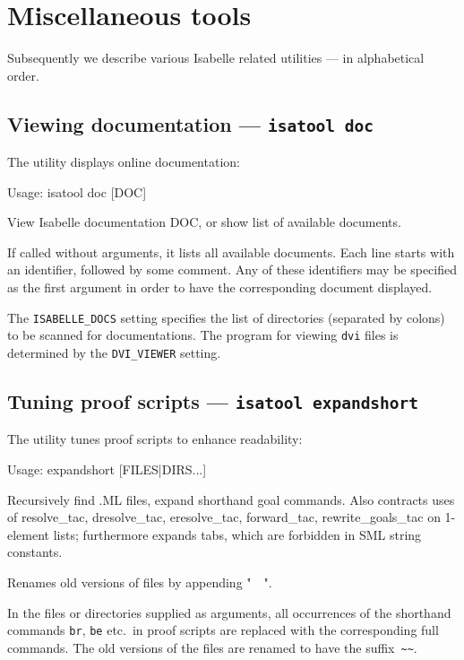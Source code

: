 

\chapter{Miscellaneous tools} \label{ch:tools}

Subsequently we describe various Isabelle related utilities --- in
alphabetical order.


\section{Viewing documentation --- \texttt{isatool doc}} \label{sec:tool-doc}

The  utility displays online documentation:
\begin{ttbox}
Usage: isatool doc [DOC]

  View Isabelle documentation DOC, or show list of available documents.
\end{ttbox}
If called without arguments, it lists all available documents. Each
line starts with an identifier, followed by some comment. Any of these
identifiers may be specified as the first argument in order to have
the corresponding document displayed.

\medskip The \texttt{ISABELLE_DOCS} setting specifies the list of
directories (separated by colons) to be scanned for documentations.
The program for viewing \texttt{dvi} files is determined by the
\texttt{DVI_VIEWER} setting.


\section{Tuning proof scripts --- \texttt{isatool expandshort}}

The  utility tunes {\ML} proof scripts to enhance
readability:
\begin{ttbox}
Usage: expandshort [FILES|DIRS...]

  Recursively find .ML files, expand shorthand goal commands.  Also
  contracts uses of resolve_tac, dresolve_tac, eresolve_tac,
  forward_tac, rewrite_goals_tac on 1-element lists; furthermore expands
  tabs, which are forbidden in SML string constants.

  Renames old versions of files by appending "~~".
\end{ttbox}
In the files or directories supplied as arguments, all occurrences of
the shorthand commands \texttt{br}, \texttt{be} etc.\ in proof scripts
are replaced with the corresponding full commands.  The old versions
of the files are renamed to have the suffix~\verb'~~'.


